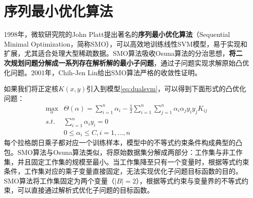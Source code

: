\section{序列最小优化算法}
1998年，微软研究院的John Platt\cite{platt1998sequential}提出著名的\textbf{序列最小优化算法}（Sequential Minimal Optimization，简称SMO），可以高效地训练线性SVM模型，易于实现和扩展，尤其适合处理大型稀疏数据。SMO算法吸收Osuna算法的分治思想，\textbf{将二次规划问题分解成一系列存在解析解的最小子问题}，通过子问题实现求解原始凸优化问题。2001年，Chih-Jen Lin\cite{lin2001convergence}给出SMO算法严格的收敛性证明。

如果我们将正定核$K(x,y)$引入到模型\eqref{eq:dualsvm}，可以得到下面形式的凸优化问题：
\begin{equation}
    \begin{array}{ll}
      \max\limits_\alpha & \Theta(\alpha) = \sum\limits_{i=1}^n \alpha_i - \frac{1}{2} \sum\limits_{i=1}^n \sum\limits_{j=1}^n \alpha_i \alpha_j y_i y_j K_{ij} \\
      \textit{s.t.} & \sum\limits_{i=1}^n \alpha_i y_i = 0 \\
      & 0\le \alpha_i \le C ,i = 1,\ldots,n
    \end{array}
\end{equation}
每个拉格朗日乘子都对应一个训练样本，模型中的不等式约束条件构成典型的凸包。SMO算法与Osuna算法类似，将原始数据集分解成两部分：工作集与非工作集，并且固定工作集的规模至最小。当工作集降至只有一个变量时，根据等式约束条件，工作集对应的乘子变量直接固定，无法实现优化子问题目标函数的目的。SMO算法将工作集固定为两个变量（$|B|=2$），根据等式约束与变量界的不等式约束，可以直接通过解析式优化子问题的目标函数。

